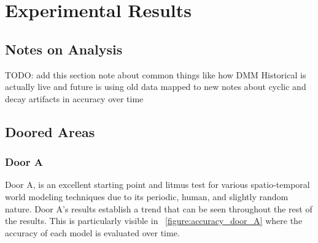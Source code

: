 

\chapter{Experimental Results}

\section{ Notes on Analysis }
TODO: add this section\?
note about common things like how DMM Historical is actually live and future is using old data mapped to new
notes about cyclic and decay artifacts in accuracy over time

\section{ Doored Areas }

\subsection { Door A }

Door A, is an excellent starting point and litmus test for various spatio-temporal
world modeling techniques due to its periodic, human, and slightly random nature.
Door A's results establish a trend that can be seen
throughout the rest of the results. This is particularly visible in ~\ref{figure:accuracy_door_A}
where the accuracy of each model is evaluated over time. \\

\begin{table}[h!]
  \centering
  \caption{Door A Data Overview}
  \label{table:door_A}
\end{table}

